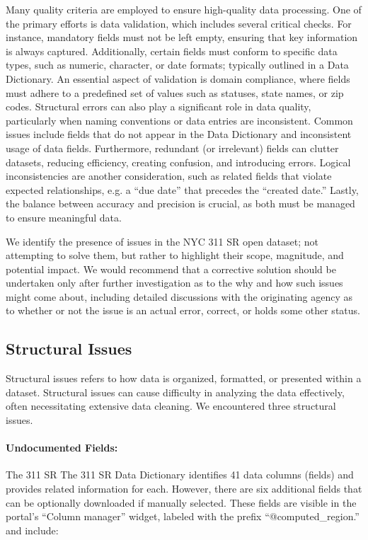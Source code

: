 \documentclass[linenumber]{jdsart}
\begin{document}
Many quality criteria are employed to ensure high-quality data 
processing. One of the primary efforts is data validation, which includes 
several critical checks. For instance, mandatory fields must not be 
left empty, ensuring that key information is always captured. 
Additionally, certain fields must conform to specific data types, 
such as numeric, character, or date formats; typically 
outlined in a Data Dictionary. An essential aspect of 
validation is domain compliance, where 
fields must adhere to a predefined set of 
values such as statuses, state names, or zip codes. Structural 
errors can also play a significant role in data quality, particularly when 
naming conventions or data entries are inconsistent. Common issues 
include fields that do not appear in the Data Dictionary and  
inconsistent usage of data fields. Furthermore, redundant 
(or irrelevant) fields can clutter datasets, reducing efficiency, 
creating confusion, and introducing errors. Logical inconsistencies 
are another consideration, such as related fields that violate expected 
relationships, e.g. a ``due date'' that precedes the ``created date.'' 
Lastly, the balance between accuracy and precision is crucial, as both 
must be managed to ensure meaningful data.


We identify the presence of issues in the NYC 311 SR open dataset;
not attempting to solve them, but rather to highlight their scope, 
magnitude, and potential impact. We would recommend 
that a corrective solution should be undertaken only 
after further investigation as to the why and how such 
issues might come about, including  detailed discussions 
with the originating agency as to whether or not the issue is an 
actual error, correct,  or holds some other status.


\subsection{Structural Issues}
\label{sec:structural}
Structural issues refers to how data is organized, formatted, 
or presented within a dataset. Structural issues can cause difficulty in 
 analyzing the data effectively, often necessitating extensive 
data cleaning. We encountered three structural issues.
 
\paragraph{Undocumented Fields:} The 311 SR 
The 311 SR Data Dictionary identifies 
41 data columns (fields) and provides related information 
for each. However, there are six additional fields that can be
optionally downloaded if manually selected. These fields are 
visible in the portal's ``Column manager'' widget, labeled with the prefix 
``@computed\_region.'' and include:
\end{document}
